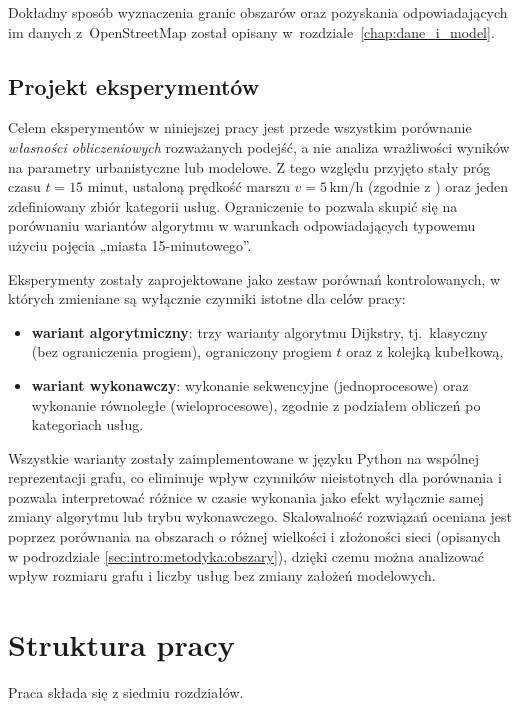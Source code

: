 Dokładny sposób wyznaczenia granic obszarów oraz pozyskania odpowiadających im danych
z~OpenStreetMap został opisany w~rozdziale~\ref{chap:dane_i_model}.

\subsection{Projekt eksperymentów}
\label{sec:intro:metodyka:scenariusze}

Celem eksperymentów w niniejszej pracy jest przede wszystkim porównanie \emph{własności
obliczeniowych} rozważanych podejść, a nie analiza wrażliwości wyników na parametry
urbanistyczne lub modelowe. Z tego względu przyjęto stały próg czasu $t=15$ minut, ustaloną
prędkość marszu $v=5\,\mathrm{km/h}$ (zgodnie z \cite{olivari2023presenting})
oraz jeden zdefiniowany zbiór kategorii usług. Ograniczenie to pozwala skupić się
na porównaniu wariantów algorytmu w warunkach odpowiadających typowemu użyciu pojęcia
„miasta 15-minutowego”.

Eksperymenty zostały zaprojektowane jako zestaw porównań kontrolowanych, w których zmieniane
są wyłącznie czynniki istotne dla celów pracy:
\begin{itemize}
  \item \textbf{wariant algorytmiczny}: trzy warianty algorytmu Dijkstry, tj.\ klasyczny
        (bez ograniczenia progiem), ograniczony progiem $t$ oraz z kolejką kubełkową,
  \item \textbf{wariant wykonawczy}: wykonanie sekwencyjne (jednoprocesowe) oraz wykonanie
        równoległe (wieloprocesowe), zgodnie z podziałem obliczeń po kategoriach usług.
\end{itemize}
Wszystkie warianty zostały zaimplementowane w języku Python na wspólnej reprezentacji grafu,
co eliminuje wpływ czynników nieistotnych dla porównania i pozwala interpretować różnice
w czasie wykonania jako efekt wyłącznie samej zmiany algorytmu lub trybu wykonawczego.
Skalowalność rozwiązań oceniana jest poprzez porównania na obszarach o różnej wielkości
i złożoności sieci (opisanych w podrozdziale \ref{sec:intro:metodyka:obszary}), dzięki czemu
można analizować wpływ rozmiaru grafu i liczby usług bez zmiany założeń modelowych.

\section{Struktura pracy}
\label{sec:intro:struktura}

Praca składa się z siedmiu rozdziałów.

